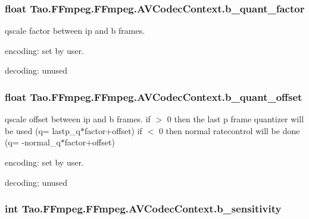 \label{struct_tao_1_1_f_fmpeg_1_1_f_fmpeg_1_1_a_v_codec_context_adccd5dbdfadc27b53529a93d1b99cbaa}
\hypertarget{struct_tao_1_1_f_fmpeg_1_1_f_fmpeg_1_1_a_v_codec_context_a235725a43eca59ce1709081f86d5a120}{
\subsubsection[{b\_\-quant\_\-factor}]{\setlength{\rightskip}{0pt plus 5cm}float {\bf Tao.FFmpeg.FFmpeg.AVCodecContext.b\_\-quant\_\-factor}}}
\label{struct_tao_1_1_f_fmpeg_1_1_f_fmpeg_1_1_a_v_codec_context_a235725a43eca59ce1709081f86d5a120}
qscale factor between ip and b frames.
\begin{DoxyItemize}
\item encoding: set by user.
\item decoding: unused 
\end{DoxyItemize}\hypertarget{struct_tao_1_1_f_fmpeg_1_1_f_fmpeg_1_1_a_v_codec_context_a72ffe61d49b3ac0d7a61b1194a4c51c3}{
\subsubsection[{b\_\-quant\_\-offset}]{\setlength{\rightskip}{0pt plus 5cm}float {\bf Tao.FFmpeg.FFmpeg.AVCodecContext.b\_\-quant\_\-offset}}}
\label{struct_tao_1_1_f_fmpeg_1_1_f_fmpeg_1_1_a_v_codec_context_a72ffe61d49b3ac0d7a61b1194a4c51c3}
qscale offset between ip and b frames. if $>$ 0 then the last p frame quantizer will be used (q= lastp\_\-q$\ast$factor+offset) if $<$ 0 then normal ratecontrol will be done (q= -\/normal\_\-q$\ast$factor+offset)
\begin{DoxyItemize}
\item encoding: set by user.
\item decoding: unused 
\end{DoxyItemize}\hypertarget{struct_tao_1_1_f_fmpeg_1_1_f_fmpeg_1_1_a_v_codec_context_adb981afbdb7764f5c573c017554f0f3b}{
\subsubsection[{b\_\-sensitivity}]{\setlength{\rightskip}{0pt plus 5cm}int {\bf Tao.FFmpeg.FFmpeg.AVCodecContext.b\_\-sensitivity}}}
